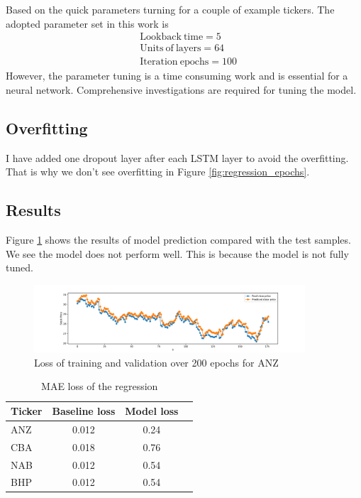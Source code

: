 \documentclass[a4paper, 11pt, usenatbib]{article}
\begin{document}
Based on the quick parameters turning for a couple of example tickers. The adopted parameter set in this work is
\begin{align*}
&\mathrm{Lookback\ time} = 5 \\
&\mathrm{Units\ of\ layers} = 64 \\
&\mathrm{Iteration\ epochs} = 100 
\end{align*}
However, the parameter tuning is a time consuming work and is essential for a neural network. Comprehensive investigations are required for tuning the model.

\subsection{Overfitting}
I have added one dropout layer after each LSTM layer to avoid the overfitting. That is why we don't see overfitting in Figure \ref{fig:regression_epochs}. 

\subsection{Results}

Figure \ref{fig:regression_test} shows the results of model prediction compared with the test samples. We see the model does not perform well.
This is because the model is not fully tuned. 
\begin{figure}
	\centering
	\includegraphics[width=0.9\textwidth]{./figures/regression_test.pdf}
	\caption[]
	{Loss of training and validation over 200 epochs for ANZ}
		\label{fig:regression_test}
\end{figure}

\begin{table}
 \caption{MAE loss of the regression}
 \label{tab:regression_loss}
 \centering
 \begin{tabular}
 { l  c  c  l }
  \hline
 Ticker & Baseline loss & Model loss\\
 \hline
 ANZ & 0.012 & 0.24 \\
 CBA & 0.018 & 0.76 \\
 NAB & 0.012 & 0.54\\
 BHP & 0.012 & 0.54 &\\

  \hline
 \end{tabular}
\end{table}  
\end{document}
